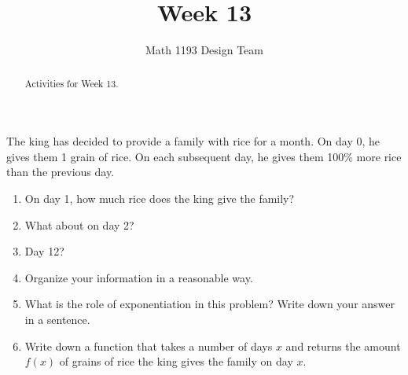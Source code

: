\documentclass[noauthor]{ximera}
\title{Week 13}
\author{Math 1193 Design Team}
\begin{document}
\begin{abstract}
    Activities for Week 13.
\end{abstract}
\maketitle

\begin{problem}
The king has decided to provide a family with rice for a month. 
On day 0, he gives them 1 grain of rice. On each subsequent day, 
he gives them 100\% more rice than the previous day. 

\begin{enumerate}
    \item On day 1, how much rice does the king give the family?
    \item What about on day 2?
    \item Day 12?
    \item Organize your information in a reasonable way.
    \item What is the role of exponentiation in this problem? Write down
    your answer in a sentence.
    \item Write down a function that takes a number of days \(x\)
    and returns the amount \(f(x)\) of grains of rice the king gives the
    family on day \(x\).
\end{enumerate}
\end{problem}
\end{document}
